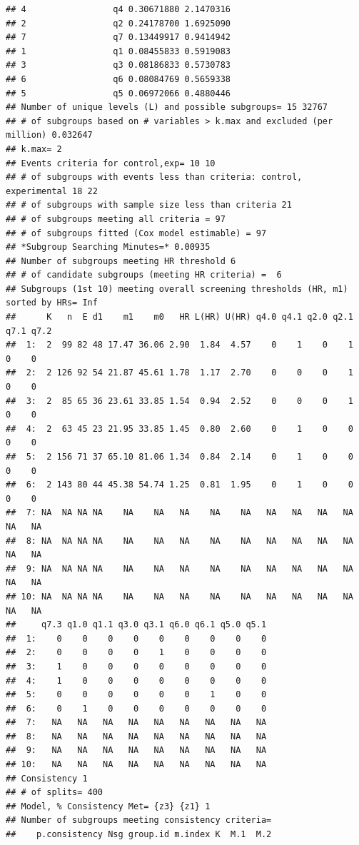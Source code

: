 \documentclass[smallextended]{svjour3}
\makeatletter
\newenvironment{kframe}{%
 \def\at@end@of@kframe{}%
 \ifinner\ifhmode%
  \def\at@end@of@kframe{\end{minipage}}%
  \begin{minipage}{\columnwidth}%
 \fi\fi%
 \def\FrameCommand##1{\hskip\@totalleftmargin \hskip-\fboxsep
 \colorbox{shadecolor}{##1}\hskip-\fboxsep
     \hskip-\linewidth \hskip-\@totalleftmargin \hskip\columnwidth}%
 \MakeFramed {\advance\hsize-\width
   \@totalleftmargin\z@ \linewidth\hsize
   \@setminipage}}%
 {\par\unskip\endMakeFramed%
 \at@end@of@kframe}
\newenvironment{knitrout}{}{} %
\makeatother
\begin{document}
\begin{knitrout}
\begin{kframe}
\begin{verbatim}
## 4                 q4 0.30671880 2.1470316
## 2                 q2 0.24178700 1.6925090
## 7                 q7 0.13449917 0.9414942
## 1                 q1 0.08455833 0.5919083
## 3                 q3 0.08186833 0.5730783
## 6                 q6 0.08084769 0.5659338
## 5                 q5 0.06972066 0.4880446
## Number of unique levels (L) and possible subgroups= 15 32767 
## # of subgroups based on # variables > k.max and excluded (per million) 0.032647 
## k.max= 2 
## Events criteria for control,exp= 10 10 
## # of subgroups with events less than criteria: control, experimental 18 22 
## # of subgroups with sample size less than criteria 21 
## # of subgroups meeting all criteria = 97 
## # of subgroups fitted (Cox model estimable) = 97 
## *Subgroup Searching Minutes=* 0.00935 
## Number of subgroups meeting HR threshold 6 
## # of candidate subgroups (meeting HR criteria) =  6 
## Subgroups (1st 10) meeting overall screening thresholds (HR, m1) sorted by HRs= Inf 
##      K   n  E d1    m1    m0   HR L(HR) U(HR) q4.0 q4.1 q2.0 q2.1 q7.1 q7.2
##  1:  2  99 82 48 17.47 36.06 2.90  1.84  4.57    0    1    0    1    0    0
##  2:  2 126 92 54 21.87 45.61 1.78  1.17  2.70    0    0    0    1    0    0
##  3:  2  85 65 36 23.61 33.85 1.54  0.94  2.52    0    0    0    1    0    0
##  4:  2  63 45 23 21.95 33.85 1.45  0.80  2.60    0    1    0    0    0    0
##  5:  2 156 71 37 65.10 81.06 1.34  0.84  2.14    0    1    0    0    0    0
##  6:  2 143 80 44 45.38 54.74 1.25  0.81  1.95    0    1    0    0    0    0
##  7: NA  NA NA NA    NA    NA   NA    NA    NA   NA   NA   NA   NA   NA   NA
##  8: NA  NA NA NA    NA    NA   NA    NA    NA   NA   NA   NA   NA   NA   NA
##  9: NA  NA NA NA    NA    NA   NA    NA    NA   NA   NA   NA   NA   NA   NA
## 10: NA  NA NA NA    NA    NA   NA    NA    NA   NA   NA   NA   NA   NA   NA
##     q7.3 q1.0 q1.1 q3.0 q3.1 q6.0 q6.1 q5.0 q5.1
##  1:    0    0    0    0    0    0    0    0    0
##  2:    0    0    0    0    1    0    0    0    0
##  3:    1    0    0    0    0    0    0    0    0
##  4:    1    0    0    0    0    0    0    0    0
##  5:    0    0    0    0    0    0    1    0    0
##  6:    0    1    0    0    0    0    0    0    0
##  7:   NA   NA   NA   NA   NA   NA   NA   NA   NA
##  8:   NA   NA   NA   NA   NA   NA   NA   NA   NA
##  9:   NA   NA   NA   NA   NA   NA   NA   NA   NA
## 10:   NA   NA   NA   NA   NA   NA   NA   NA   NA
## Consistency 1 
## # of splits= 400 
## Model, % Consistency Met= {z3} {z1} 1 
## Number of subgroups meeting consistency criteria= 
##    p.consistency Nsg group.id m.index K  M.1  M.2

\end{verbatim}
\end{kframe}
\end{knitrout}
\end{document}
